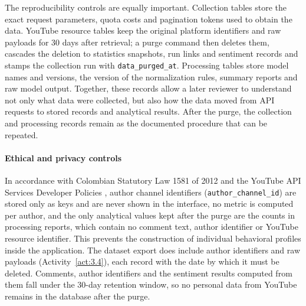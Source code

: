 The reproducibility controls are equally important. Collection tables store the exact request parameters, quota costs and pagination tokens used to obtain the data. YouTube resource tables keep the original platform identifiers and raw payloads for 30 days after retrieval; a purge command then deletes them, cascades the deletion to statistics snapshots, run links and sentiment records and stamps the collection run with \texttt{data\_\allowbreak purged\_\allowbreak at}. Processing tables store model names and versions, the version of the normalization rules, summary reports and raw model output. Together, these records allow a later reviewer to understand not only what data were collected, but also how the data moved from API requests to stored records and analytical results. After the purge, the collection and processing records remain as the documented procedure that can be repeated.

\paragraph{Ethical and privacy controls}

In accordance with Colombian Statutory Law 1581 of 2012 \autocite{ley1581_2012} and the YouTube API Services Developer Policies \autocite{youtube_api_services_developer_policies}, author channel identifiers (\texttt{author\_channel\_id}) are stored only as keys and are never shown in the interface, no metric is computed per author, and the only analytical values kept after the purge are the counts in processing reports, which contain no comment text, author identifier or YouTube resource identifier. This prevents the construction of individual behavioral profiles inside the application. The dataset export does include author identifiers and raw payloads (Activity~\ref{act:3.4}), each record with the date by which it must be deleted. Comments, author identifiers and the sentiment results computed from them fall under the 30-day retention window, so no personal data from YouTube remains in the database after the purge.

